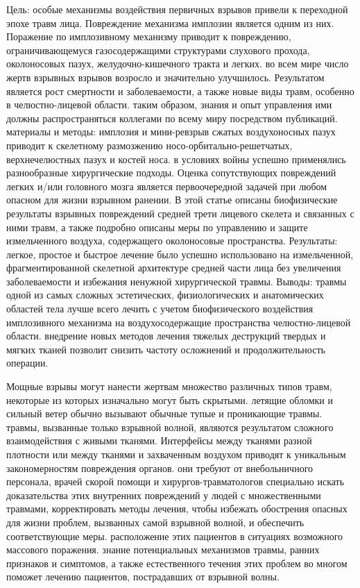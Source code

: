 Цель: особые механизмы воздействия первичных взрывов привели к переходной эпохе
травм лица. Повреждение механизма имплозии является одним из них. Поражение по
имплозивному механизму приводит к повреждению, ограничивающемуся газосодержащими
структурами слухового прохода, околоносовых пазух, желудочно-кишечного тракта и
легких. во всем мире число жертв взрывных взрывов возросло и значительно
улучшилось. Результатом является рост смертности и заболеваемости, а также новые
виды травм, особенно в челюстно-лицевой области. таким образом, знания и опыт
управления ими должны распространяться коллегами по всему миру посредством
публикаций. материалы и методы: имплозия и мини-ревзрыв сжатых воздухоносных
пазух приводит к скелетному размозжению носо-орбитально-решетчатых,
верхнечелюстных пазух и костей носа. в условиях войны успешно применялись
разнообразные хирургические подходы. Оценка сопутствующих повреждений легких
и/или головного мозга является первоочередной задачей при любом опасном для
жизни взрывном ранении. В этой статье описаны биофизические результаты взрывных
повреждений средней трети лицевого скелета и связанных с ними травм, а также
подробно описаны меры по управлению и защите измельченного воздуха, содержащего
околоносовые пространства. Результаты: легкое, простое и быстрое лечение было
успешно использовано на измельченной, фрагментированной скелетной архитектуре
средней части лица без увеличения заболеваемости и избежания ненужной
хирургической травмы. Выводы: травмы одной из самых сложных эстетических,
физиологических и анатомических областей тела лучше всего лечить с учетом
биофизического воздействия имплозивного механизма на воздухосодержащие
пространства челюстно-лицевой области. внедрение новых методов лечения тяжелых
деструкций твердых и мягких тканей позволит снизить частоту осложнений и
продолжительность операции.\cite{20006161}

Мощные взрывы могут нанести жертвам множество различных типов травм, некоторые
из которых изначально могут быть скрытыми. летящие обломки и сильный ветер
обычно вызывают обычные тупые и проникающие травмы. травмы, вызванные только
взрывной волной, являются результатом сложного взаимодействия с живыми тканями.
Интерфейсы между тканями разной плотности или между тканями и захваченным
воздухом приводят к уникальным закономерностям повреждения органов. они требуют
от внебольничного персонала, врачей скорой помощи и хирургов-травматологов
специально искать доказательства этих внутренних повреждений у людей с
множественными травмами, корректировать методы лечения, чтобы избежать
обострения опасных для жизни проблем, вызванных самой взрывной волной, и
обеспечить соответствующие меры. расположение этих пациентов в ситуациях
возможного массового поражения. знание потенциальных механизмов травмы, ранних
признаков и симптомов, а также естественного течения этих проблем во многом
поможет лечению пациентов, пострадавших от взрывной волны.\cite{11385339}

